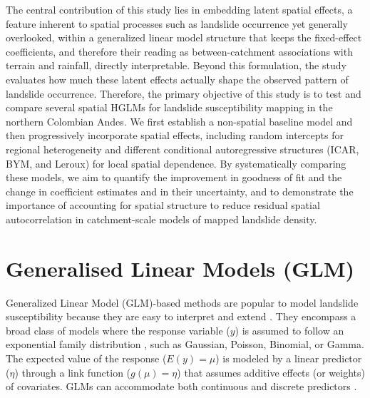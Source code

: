 \documentclass[journal abbreviation, manuscript]{copernicus}
\newcommand{\hl}[1]{#1}
\newcommand{\hlG}[1]{#1}
\newcommand{\hlE}[1]{#1}
\begin{document}
\hlG{The central contribution of this study lies in embedding latent spatial effects, a feature inherent to spatial processes such as landslide occurrence yet generally overlooked, within a generalized linear model structure that keeps the fixed-effect coefficients, and therefore} \hlE{their reading as between-catchment associations with terrain and rainfall,} \hlG{directly interpretable. 
Beyond this formulation, the study evaluates how much these latent effects actually shape the observed pattern of landslide occurrence.}
Therefore, the primary objective of this study is to test and compare several spatial HGLMs for landslide susceptibility mapping in the northern Colombian Andes. 
We first establish a non-spatial baseline model and then progressively incorporate spatial effects, including random intercepts for regional heterogeneity and different conditional autoregressive structures (ICAR, BYM, and Leroux) for local spatial dependence. 
\hl{By systematically comparing these models, we aim to quantify the improvement in goodness of fit} \hlE{and the change in coefficient estimates and in their uncertainty,} \hl{and to demonstrate the importance of accounting for spatial structure to reduce residual spatial autocorrelation} \hlE{in catchment-scale models of mapped landslide density.}


\section{Generalised Linear Models (GLM)}\label{sec2}

Generalized Linear Model (GLM)-based methods are popular to model landslide susceptibility because they are easy to interpret and extend \citep{reichenbach2018review, corominas2014recommendations, guzzetti1999landslide}. They encompass a broad class of models where the response variable ($y$) is assumed to follow an exponential family distribution \citep{coxe2013generalized, hastie2017generalized}, such as Gaussian, Poisson, Binomial, or Gamma. The expected value of the response ($E(y) = \mu$) is modeled by a linear predictor ($\eta$) through a link function ($g(\mu) = \eta$) that assumes additive effects (or weights) of covariates. GLMs can accommodate both continuous and discrete predictors \citep{camilo2017handling, goetz2011integrating}.
\end{document}

